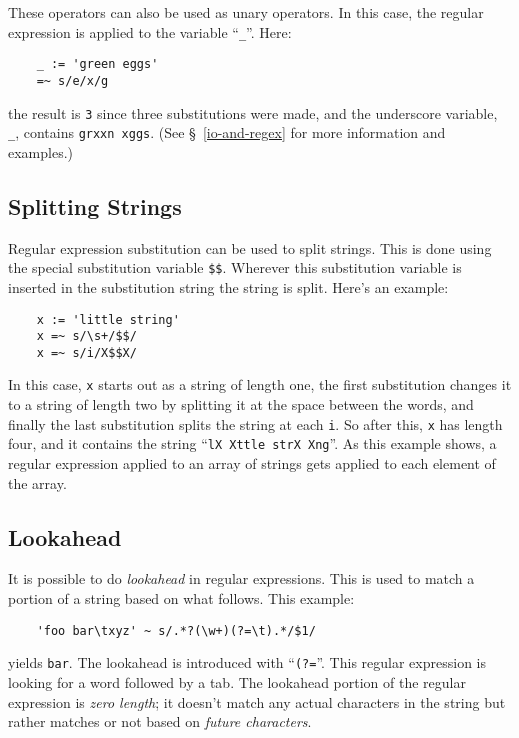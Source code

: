 These operators can also be used as unary operators. In this case, the
regular expression is applied to the variable ``{\tt \_}''. Here:
\begin{verbatim}
    _ := 'green eggs'
    =~ s/e/x/g
\end{verbatim}
the result is {\tt 3} since three substitutions were made, and the
underscore variable, \verb+_+, contains \verb+grxxn xggs+.
(See \S~\ref{io-and-regex} for more information and examples.)

\subsection{Splitting Strings}

Regular expression substitution can be used to split strings. This is done
using the special substitution variable {\tt \verb+$$+}. Wherever this substitution
variable is inserted in the substitution string the string is split. Here's
an example:
\begin{verbatim}
    x := 'little string'
    x =~ s/\s+/$$/
    x =~ s/i/X$$X/
\end{verbatim}
In this case, {\tt x} starts out as a string of length one, the first substitution
changes it to a string of length two by splitting it at the space between the words,
and finally the last substitution splits the string at each {\tt i}. So after this,
{\tt x} has length four, and it contains the string ``\verb+lX Xttle strX Xng+''.
As this example shows, a regular expression applied to an array of strings
gets applied to each element of the array.

\subsection{Lookahead}
It is possible to do {\em lookahead} in regular expressions. This is used
to match a portion of a string based on what follows. This example:
\begin{verbatim}
    'foo bar\txyz' ~ s/.*?(\w+)(?=\t).*/$1/
\end{verbatim}
yields {\tt bar}. The lookahead is introduced with ``\verb+(?=+''. This
regular expression is looking for a word followed by a tab. The lookahead
portion of the regular expression is {\em zero length}; it doesn't match
any actual characters in the string but rather matches or not based on
{\em future characters}.

